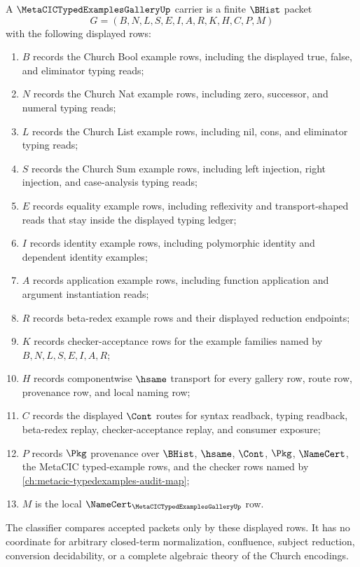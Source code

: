 \begin{definition}
\label{def:metacic-typedexamples-gallery-carrier}
A $\MetaCICTypedExamplesGalleryUp$ carrier is a finite $\BHist$ packet
$$
G=(B,N,L,S,E,I,A,R,K,H,C,P,M)
$$
with the following displayed rows:
\begin{enumerate}
\item $B$ records the Church Bool example rows, including the displayed true, false, and eliminator typing reads;
\item $N$ records the Church Nat example rows, including zero, successor, and numeral typing reads;
\item $L$ records the Church List example rows, including nil, cons, and eliminator typing reads;
\item $S$ records the Church Sum example rows, including left injection, right injection, and case-analysis typing reads;
\item $E$ records equality example rows, including reflexivity and transport-shaped reads that stay inside the displayed typing ledger;
\item $I$ records identity example rows, including polymorphic identity and dependent identity examples;
\item $A$ records application example rows, including function application and argument instantiation reads;
\item $R$ records beta-redex example rows and their displayed reduction endpoints;
\item $K$ records checker-acceptance rows for the example families named by $B,N,L,S,E,I,A,R$;
\item $H$ records componentwise $\hsame$ transport for every gallery row, route row, provenance row, and local naming row;
\item $C$ records the displayed $\Cont$ routes for syntax readback, typing readback, beta-redex replay, checker-acceptance replay, and consumer exposure;
\item $P$ records $\Pkg$ provenance over $\BHist$, $\hsame$, $\Cont$, $\Pkg$, $\NameCert$, the MetaCIC typed-example rows, and the checker rows named by \autoref{ch:metacic-typedexamples-audit-map};
\item $M$ is the local $\NameCert_{\MetaCICTypedExamplesGalleryUp}$ row.
\end{enumerate}
The classifier compares accepted packets only by these displayed rows. It has no coordinate for arbitrary closed-term normalization, confluence, subject reduction, conversion decidability, or a complete algebraic theory of the Church encodings.
\end{definition}

